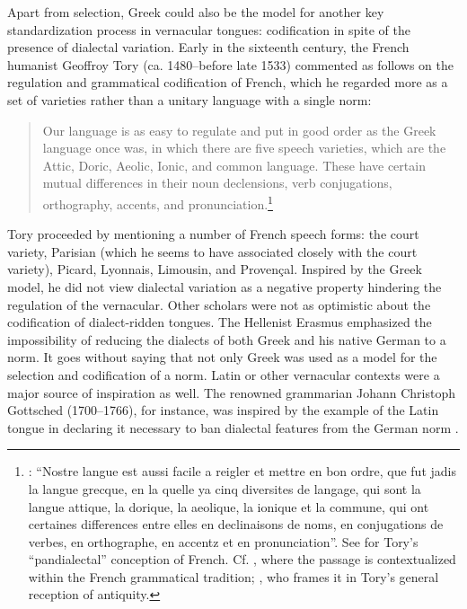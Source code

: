 Apart from selection, Greek could also be the model for another key standardization process in vernacular tongues: codification in spite of the presence of dialectal variation. Early in the sixteenth century, the French humanist Geoffroy Tory (ca. 1480–before late 1533) commented as follows on the regulation and grammatical codification of French, which he regarded more as a set of varieties rather than a unitary language with a single norm:

\begin{quote}
Our language is as easy to regulate and put in good order as the Greek language once was, in which there are five speech varieties, which are the Attic, Doric, Aeolic, Ionic, and common language. These have certain mutual differences in their noun declensions, verb conjugations, orthography, accents, and pronunciation.\footnote{\citet[\textsc{iv}\textsc{\textsuperscript{v}}\textsc{–v}\textsc{\textsuperscript{r}}]{Tory1529}: “Nostre langue est aussi facile a reigler et mettre en bon ordre, que fut jadis la langue grecque, en la quelle ya cinq diversites de langage, qui sont la langue attique, la dorique, la aeolique, la ionique et la commune, qui ont certaines differences entre elles en declinaisons de noms, en conjugations de verbes, en orthographe, en accentz et en pronunciation”. See \citet[466--467]{Trudeau1983} for Tory’s “pandialectal” conception of French. Cf. \citet[19--20]{Defaux2003}, where the passage is contextualized within the French grammatical tradition; \citet[23]{Cordier2006}, who frames it in Tory’s general reception of antiquity.}
\end{quote}

Tory proceeded by mentioning a number of French speech forms: the court variety, Parisian (which he seems to have associated closely with the court variety), Picard, Lyonnais, Limousin, and Provençal. Inspired by the Greek model, he did not view dialectal variation as a negative property hindering the regulation of the vernacular. Other scholars were not as optimistic about the codification of dialect-ridden tongues. The Hellenist Erasmus \citet[239]{Schmidt1615} emphasized the impossibility of reducing the dialects of both Greek and his native German to a norm. It goes without saying that not only Greek was used as a model for the selection and codification of a norm. Latin or other vernacular contexts were a major source of inspiration as well. The renowned grammarian Johann Christoph Gottsched (1700–1766), for instance, was inspired by the example of the Latin tongue in declaring it necessary to ban dialectal features from the German norm \citep[334]{Gottsched1748}.

